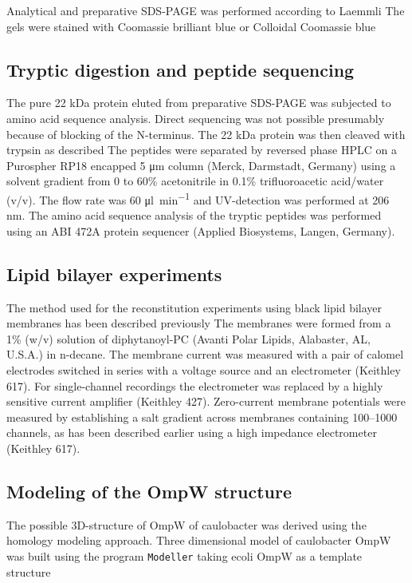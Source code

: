 Analytical and preparative \ac{SDS-PAGE} was performed according to Laemmli The gels were stained with Coomassie brilliant blue or Colloidal Coomassie blue 

\subsection{Tryptic digestion and peptide sequencing}
\label{sub:porin_tryptic}
The pure 22 kDa protein eluted from preparative \ac{SDS-PAGE} was subjected to amino acid sequence analysis. Direct sequencing was not possible presumably because of blocking of the N-terminus. The 22 kDa protein was then cleaved with trypsin as described The peptides were separated by reversed phase HPLC on a Purospher RP18 encapped 5 \si{\micro\metre} column (Merck, Darmstadt, Germany) using a solvent gradient from 0 to 60\% acetonitrile in 0.1\% trifluoroacetic acid/water (v/v). The flow rate was 60 \si{\micro\litre\per\minute} and UV-detection was performed at 206 \si{\nano\metre}. The amino acid sequence analysis of the tryptic peptides was performed using an ABI 472A protein sequencer (Applied Biosystems, Langen, Germany).

\subsection{Lipid bilayer experiments}
\label{sub:porin_bilayer}
The method used for the reconstitution experiments using black lipid bilayer membranes has been described previously The membranes were formed from a 1\% (w/v) solution of diphytanoyl-\ac{PC} (Avanti Polar Lipids, Alabaster, AL, U.S.A.) in n-decane. The membrane current was measured with a pair of calomel electrodes switched in series with a voltage source and an electrometer (Keithley 617). For single-channel recordings the electrometer was replaced by a highly sensitive current amplifier (Keithley 427). Zero-current membrane potentials were measured by establishing a salt gradient across membranes containing 100--1000 channels, as has been described earlier using a high impedance electrometer (Keithley 617).

\subsection{Modeling of the OmpW structure}
\label{sub:porin_modeling}
The possible 3D-structure of OmpW of \ac{caulobacter} was derived using the homology modeling approach. Three dimensional model of \ac{caulobacter} OmpW was built using the program \texttt{Modeller} taking \ac{ecoli} OmpW as a template structure
 
